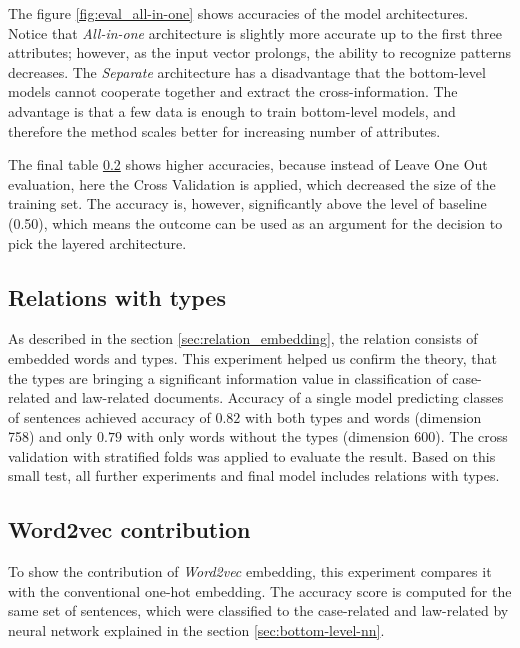 \documentclass[
  digital, %
  notable,   %
  nolof,     %
  nolot,     %
]{fithesis3}
\begin{document}
The figure \ref{fig:eval_all-in-one} shows accuracies of the model architectures.
Notice that \textit{All-in-one} architecture is slightly more accurate up to the first three attributes; however, as the input vector prolongs, the ability to recognize patterns decreases.
The \textit{Separate} architecture has a disadvantage that the bottom-level models cannot cooperate together and extract the cross-information.
The advantage is that a few data is enough to train bottom-level models, and therefore the method scales better for increasing number of attributes.

The final table \ref{} shows higher accuracies, because instead of Leave One Out evaluation, here the Cross Validation is applied, which decreased the size of the training set. 
The accuracy is, however, significantly above the level of baseline (0.50), which means the outcome can be used as an argument for the decision to pick the layered architecture.

\subsection{Relations with types}
As described in the section \ref{sec:relation_embedding}, the relation consists of embedded words and types.
This experiment helped us confirm the theory, that the types are bringing a significant information value in classification of case-related and law-related documents.
Accuracy of a single model predicting classes of sentences achieved accuracy of $0.82$ with both types and words (dimension 758) and only $0.79$ with only words without the types (dimension 600).
The cross validation with stratified folds was applied to evaluate the result.
Based on this small test, all further experiments and final model includes relations with types.


\subsection{Word2vec contribution}
To show the contribution of \textit{Word2vec} embedding, this experiment compares it with the conventional one-hot embedding.
The accuracy score is computed for the same set of sentences, which were classified to the case-related and law-related by neural network explained in the section \ref{sec:bottom-level-nn}.
\end{document}

